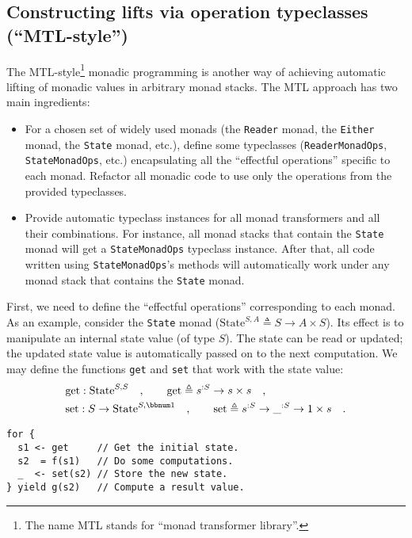\subsection{Constructing lifts via operation typeclasses (\textquotedblleft MTL-style\textquotedblright )\label{subsec:Combining-monads-via-mtl-style}}

The MTL-style\footnote{The name MTL stands for \textsf{``}monad transformer library\textsf{''}.}
monadic programming is another way
of achieving automatic lifting of monadic values in arbitrary monad
stacks. The MTL approach has two main ingredients:
\begin{itemize}
\item For a chosen set of widely used monads (the \lstinline!Reader! monad,
the \lstinline!Either! monad, the \lstinline!State! monad, etc.),
define some typeclasses (\lstinline!ReaderMonadOps!, \lstinline!StateMonadOps!,
etc.) encapsulating all the \textsf{``}effectful operations\textsf{''} specific to
each monad. Refactor all monadic code to use only the operations from
the provided typeclasses. 
\item Provide automatic typeclass instances for all monad transformers and
all their combinations. For instance, all monad stacks that contain
the \lstinline!State! monad will get a \lstinline!StateMonadOps!
typeclass instance. After that, all code written using \lstinline!StateMonadOps!\textsf{'}s
methods will automatically work under any monad stack that contains
the \lstinline!State! monad.
\end{itemize}
First, we need to define the \textsf{``}effectful operations\textsf{''} corresponding
to each monad. As an example, consider the \lstinline!State! monad
($\text{State}^{S,A}\triangleq S\rightarrow A\times S$). Its effect
is to manipulate an internal state value (of type $S$). The state
can be read or updated; the updated state value is automatically passed
on to the next computation. We may define the functions \lstinline!get!
and \lstinline!set! that work with the state value:
\begin{align*}
 & \text{get}:\text{State}^{S,S}\quad,\quad\quad\text{get}\triangleq s^{:S}\rightarrow s\times s\quad,\\
 & \text{set}:S\rightarrow\text{State}^{S,\bbnum 1}\quad,\quad\quad\text{set}\triangleq s^{:S}\rightarrow\_^{:S}\rightarrow1\times s\quad.
\end{align*}

\begin{lstlisting}
for {
  s1 <- get     // Get the initial state.
  s2  = f(s1)   // Do some computations.
  _  <- set(s2) // Store the new state.
} yield g(s2)   // Compute a result value.
\end{lstlisting}


